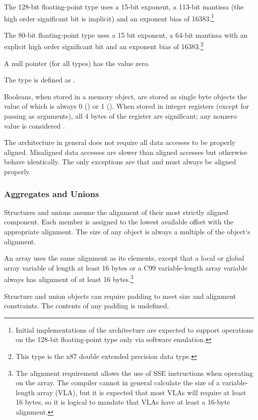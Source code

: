 The 128-bit floating-point type uses a 15-bit exponent, a 113-bit
mantissa (the high order significant bit is implicit) and an exponent
bias of 16383.\footnote{Initial implementations of the \xARCH
  architecture are expected to support operations on the
  128-bit floating-point  type only via software emulation.}

The 80-bit floating-point type uses a 15 bit exponent, a 64-bit mantissa
with an explicit high order significant bit and an exponent bias of
16383.\footnote{This type is the x87 double extended precision data
  type.} 

A null pointer (for all types) has the value zero.

The type  is defined as .

Booleans, when stored in a memory object, are stored as
single byte objects the value of which is always 0 () or 1
().  When stored in integer registers (except for passing
as arguments), all 4 bytes of the register are significant;
any nonzero value is considered .

The \xARCH architecture in general
does not require all data accesses to be properly aligned.  Misaligned
data accesses are slower than aligned accesses
but otherwise behave identically.  The only exceptions are that
 and  must always be aligned properly.

\subsubsection{Aggregates and Unions}

Structures and unions assume the alignment of their most strictly
aligned component.  Each member is assigned to the lowest available
offset with the appropriate alignment.  The size of any object is always
a multiple of the object`s alignment.

An array uses the same alignment as its elements, except that a local
or global array variable of length at least 16 bytes or a C99
variable-length array variable always has alignment
of at least 16 bytes.\footnote{The alignment requirement allows the
  use of SSE instructions when operating on the array.  The compiler
  cannot in general calculate the size of a variable-length array (VLA), but
  it is expected that most VLAs will require at least 16 bytes, so it
  is logical to mandate that VLAs have at least a 16-byte alignment.}

Structure and union objects can require padding to meet size and
alignment constraints.  The contents of any padding is undefined.

